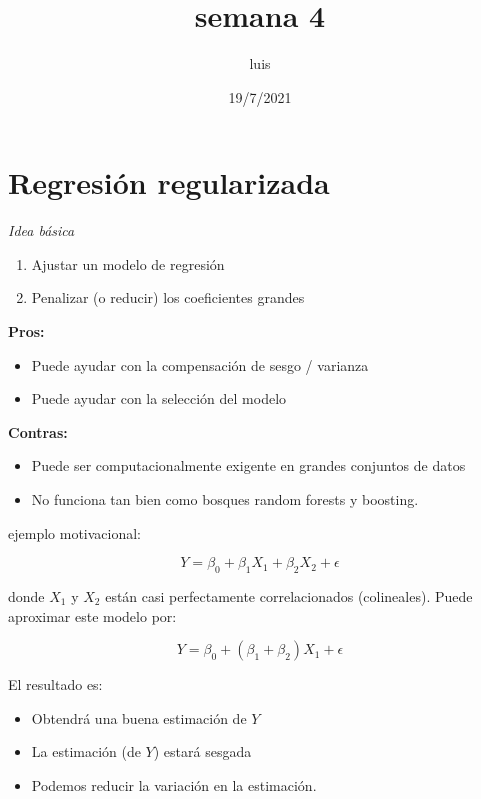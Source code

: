 \documentclass[
]{article}
\title{semana 4}
\author{luis}
\date{19/7/2021}
\providecommand{\tightlist}{%
  \setlength{\itemsep}{0pt}\setlength{\parskip}{0pt}}
\begin{document}
\maketitle

\tableofcontents

\hypertarget{regresiuxf3n-regularizada}{%
\section{Regresión regularizada}\label{regresiuxf3n-regularizada}}

\emph{Idea básica}

\begin{enumerate}
\def\labelenumi{\arabic{enumi}.}
\tightlist
\item
  Ajustar un modelo de regresión
\item
  Penalizar (o reducir) los coeficientes grandes
\end{enumerate}

\textbf{Pros: }

\begin{itemize}
\tightlist
\item
  Puede ayudar con la compensación de sesgo / varianza
\item
  Puede ayudar con la selección del modelo
\end{itemize}

\textbf{Contras:}

\begin{itemize}
\tightlist
\item
  Puede ser computacionalmente exigente en grandes conjuntos de datos
\item
  No funciona tan bien como bosques random forests y boosting.
\end{itemize}

ejemplo motivacional:

\[Y = \beta_0 + \beta_1 X_1 + \beta_2 X_2 + \epsilon\]

donde \(X_1\) y \(X_2\) están casi perfectamente correlacionados
(colineales). Puede aproximar este modelo por:

\[Y = \beta_0 + (\beta_1 + \beta_2)X_1 + \epsilon\]

El resultado es:

\begin{itemize}
\tightlist
\item
  Obtendrá una buena estimación de \(Y\)
\item
  La estimación (de \(Y\)) estará sesgada
\item
  Podemos reducir la variación en la estimación.
\end{itemize}
\end{document}
